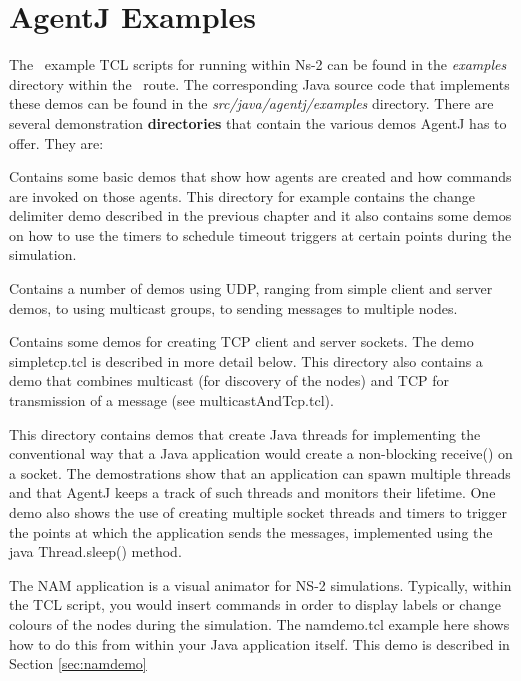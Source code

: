 \chapter{AgentJ Examples}
\label{chap:examples}

\sloppypar The \agentj~example TCL scripts for running within Ns-2 can be found in the \emph{examples} directory within the \agentj~route.  The corresponding Java source code that implements these demos can be found in the \emph{src/java/agentj/examples} directory. There are several demonstration \textbf{directories} that contain the various demos AgentJ has to offer. They are:


\begin{description}
\item
\item [basic:] Contains some basic demos that show how agents are created and how commands are invoked on those agents. This directory for example contains the change delimiter demo described in the previous chapter and it also contains some demos on how to use the timers to schedule timeout triggers at certain points during the simulation.
\item [udp:] Contains a number of demos using UDP, ranging from simple client and server demos, to using multicast groups, to sending messages to multiple nodes.  
\item [tcp:] Contains some demos for creating TCP client and server sockets.  The demo simpletcp.tcl is described in more detail below.  This directory also contains a demo that combines multicast (for discovery of the nodes) and TCP for transmission of  a message (see multicastAndTcp.tcl).
\item [threads:] This directory contains demos that create Java threads for implementing the conventional way that a Java application would create a non-blocking receive() on a socket.  The demostrations show that an application can spawn multiple threads and that AgentJ keeps a track of such threads and monitors their lifetime.    One demo also shows the use of creating multiple socket threads and timers to trigger the points at which the application sends the messages, implemented using the java Thread.sleep() method.
\item [nam:] The NAM application is a visual animator for NS-2 simulations.  Typically, within the TCL script, you would insert commands in order to display labels or change colours of the nodes during the simulation.  The namdemo.tcl example here shows how to do this from within your Java application itself. This demo is described in Section \ref{sec:namdemo} 

\end{description}
